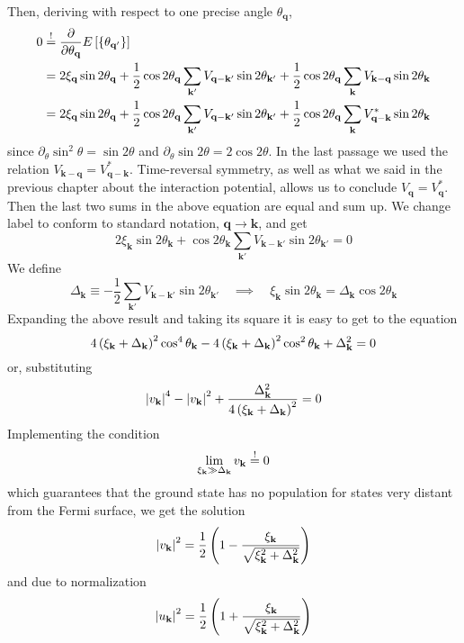 Then, deriving with respect to one precise angle $\theta_\mathbf{q}$,
\[
\begin{aligned}
	0 &\stackrel{!}{=} \pdv{}{\theta_\mathbf{q}} E\left[{\left\{{\theta_{\mathbf{q}'}}\right\}}\right] \\
	&= 2 \xi_\mathbf{q} \sin2\theta_\mathbf{q} + \frac{1}{2} 
	\cos2\theta_\mathbf{q} \sum_{\mathbf{k}'} V_{\mathbf{q}-\mathbf{k}'} \sin2\theta_{\mathbf{k}'} + \frac{1}{2} 
	\cos2\theta_\mathbf{q} \sum_\mathbf{k} V_{\mathbf{k}-\mathbf{q}} \sin2\theta_\mathbf{k} \\
	&= 2 \xi_\mathbf{q} \sin2\theta_\mathbf{q} + \frac{1}{2} 
	\cos2\theta_\mathbf{q} \sum_{\mathbf{k}'} V_{\mathbf{q}-\mathbf{k}'} \sin2\theta_{\mathbf{k}'} + \frac{1}{2} 
	\cos2\theta_\mathbf{q} \sum_\mathbf{k} V_{\mathbf{q}-\mathbf{k}}^* \sin2\theta_\mathbf{k}
\end{aligned}
\]
since $\partial_\theta \sin^2 \theta = \sin2\theta$ and $\partial_\theta \sin 2\theta = 2 \cos 2\theta$. In the last passage we used the relation $V_{\mathbf{k}-\mathbf{q}} = V_{\mathbf{q}-\mathbf{k}}^*$. Time-reversal symmetry, as well as what we said in the previous chapter about the interaction potential, allows us to conclude $V_\mathbf{q} = V_\mathbf{q}^*$. Then the last two sums in the above equation are equal and sum up. We change label to conform to standard notation, $\mathbf{q} \to \mathbf{k}$, and get
\[
	2 \xi_\mathbf{k} \sin2\theta_\mathbf{k} + 
	\cos2\theta_\mathbf{k} \sum_{\mathbf{k}'} V_{\mathbf{k}-\mathbf{k}'} \sin2\theta_{\mathbf{k}'} = 0
\]
We define
\begin{equation}\label{eq:delta variational definition}
	\Delta_\mathbf{k} \equiv - \frac{1}{2} 
	\sum_{\mathbf{k}'} V_{\mathbf{k}-\mathbf{k}'} \sin2\theta_{\mathbf{k}'}
	\quad\implies\quad
	\xi_\mathbf{k} \sin2\theta_\mathbf{k} = \Delta_\mathbf{k} \cos2\theta_\mathbf{k}
\end{equation}
Expanding the above result and taking its square it is easy to get to the equation
\[
	4 \left({\xi_\mathbf{k} + \Delta_\mathbf{k}}\right)^2 \cos^4\theta_\mathbf{k} - 4 \left({\xi_\mathbf{k} + \Delta_\mathbf{k}}\right)^2 \cos^2\theta_\mathbf{k} + \Delta_\mathbf{k}^2 = 0
\]
or, substituting
\[
	\abs{v_\mathbf{k}}^4 - \abs{v_\mathbf{k}}^2 + \frac{\Delta_\mathbf{k}^2}{4 \left({\xi_\mathbf{k} + \Delta_\mathbf{k}}\right)^2} = 0
\]
Implementing the condition
\[
	\lim_{\xi_\mathbf{k} \gg \Delta_\mathbf{k}} v_\mathbf{k} \stackrel{!}{=} 0
\]
which guarantees that the ground state has no population for states very distant from the Fermi surface, we get the solution
\begin{equation}\label{eq:v variational solution}
	\abs{v_\mathbf{k}}^2 = \frac{1}{2} \left({1 - \frac{\xi_\mathbf{k}}{\sqrt{\xi_\mathbf{k}^2 + \Delta_\mathbf{k}^2}}}\right) 
\end{equation}
and due to normalization
\begin{equation}\label{eq:u variational solution}
	\abs{u_\mathbf{k}}^2 = \frac{1}{2} \left({1 + \frac{\xi_\mathbf{k}}{\sqrt{\xi_\mathbf{k}^2 + \Delta_\mathbf{k}^2}}}\right) 
\end{equation}


